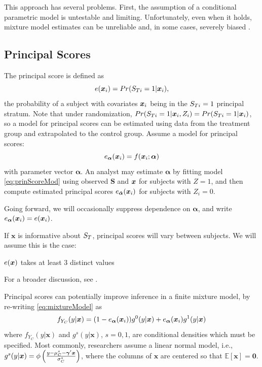 \documentclass[]{article}
\begin{document}
This approach has several problems.
First, the assumption of a conditional parametric model %
is untestable and limiting.
Unfortunately, even when it holds, mixture model estimates can be unreliable and, in some cases, severely biased \citep{griffin2008application,feller2017principal}.

\subsection{Principal Scores}
The principal score \citep[e.g.][]{jo} is defined as
\begin{equation}\label{eq:pscore}
  e(\bm{x}_i)=Pr(S_{Ti}=1|\bm{x}_i),
\end{equation}
the probability of a subject with covariates $\bm{x}_i$ being in the $S_{Ti}=1$ principal stratum.
Note that under randomization, $Pr(S_{Ti}=1|\bm{x}_i,Z_i)=Pr(S_{Ti}=1|\bm{x}_i)$, so a model for principal scores can be estimated using data from the treatment group and extrapolated to the control group.
Assume a model for principal scores:
\begin{equation}\label{eq:prinScoreMod}
  e_{\bm{\alpha}}(\bm{x}_i)=f(\bm{x}_i;\bm{\alpha})
\end{equation}
with parameter vector $\bm{\alpha}$. An analyst may estimate $\bm{\alpha}$ by fitting model \eqref{eq:prinScoreMod} using observed $\bm{S}$ and $\bm{x}$ for subjects with $Z=1$, and then compute estimated principal scores $e_{\bm{\hat{\alpha}}}(\bm{x}_i)$ for subjects with $Z_i=0$.

Going forward, we will occasionally suppress dependence on $\bm{\alpha}$, and write $e_{\bm{\alpha}}(\bm{x}_i)=e(\bm{x}_i)$.

If $\bm{x}$ is informative about $S_T$, principal scores will vary between subjects. We will assume this is the case: %
\begin{ass}\label{ass:vps}
 $e(\bm{x})$ takes at least 3 distinct values
\end{ass}
For a broader discussion, see \citet{ding2011,jiangDing2021}.

Principal scores can potentially improve inference in a finite mixture model, by re-writing \eqref{eq:mixtureModel} as
\begin{equation}\label{eq:mixtureModelPS}
  f_{Y_C}(y|\bm{x})=(1-\ppip{\bm{\alpha}})%
g^0(y|\bm{x})+\ppip{\bm{\alpha}}%
g^1(y|\bm{x})
\end{equation}
where $f_{Y_C}(y|\bm{x})$ and $g^s(y|\bm{x})$, $s=0,1$, are conditional densities which must be specified. Most commonly, researchers assume a linear normal model, i.e., $g^s(y|\bm{x})=\phi\left(\frac{y-\mu_C^s-\bm{\gamma}'\bm{x}}{\sigma_C^s}\right)$, where the columns of $\bm{x}$ are centered so that $\mathbb{E}[\bm{x}]=\bm{0}$. 
\end{document}
